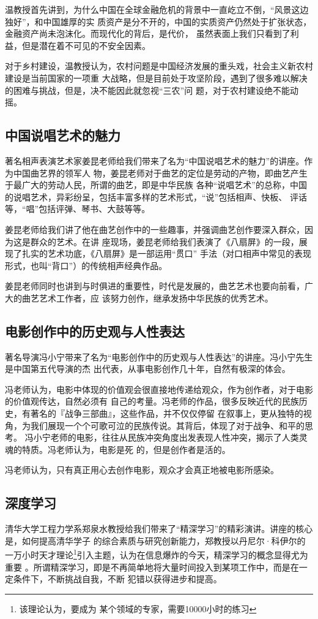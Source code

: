 \documentclass[a4paper]{cctart}
\numberwithin{equation}{section} \pagestyle{fancy}
\begin{document}
温教授首先讲到，为什么中国在全球金融危机的背景中一直屹立不倒，“风景这边独好”，和中国雄厚的实
质资产是分不开的，中国的实质资产仍然处于扩张状态，金融资产尚未泡沫化。而现代化的背后，是代价，
虽然表面上我们只看到了利益，但是潜在着不可见的不安全因素。

对于乡村建设，温教授认为，农村问题是中国经济发展的重头戏，社会主义新农村建设是当前国家的一项重
大战略，但是目前处于攻坚阶段，遇到了很多难以解决的困难与挑战，但是，决不能因此就忽视“三农”问
题，对于农村建设绝不能动摇。
\subsection{中国说唱艺术的魅力}
著名相声表演艺术家姜昆老师给我们带来了名为“中国说唱艺术的魅力”的讲座。作为中国曲艺界的领军人
物，姜昆老师对于曲艺的定位是劳动的产物，即曲艺产生于最广大的劳动人民，所谓的曲艺，即是中华民族
各种“说唱艺术”的总称，中国的说唱艺术，异彩纷呈，包括丰富多样的艺术形式，“说”包括相声、快板、
评话等，“唱”包括评弹、琴书、大鼓等等。

姜昆老师给我们讲了他在曲艺创作中的一些趣事，并强调曲艺创作要深入群众，因为这是群众的艺术。在讲
座现场，姜昆老师给我们表演了《八扇屏》的一段，展现了扎实的艺术功底，《八扇屏》是一部运用“贯口”
手法（对口相声中常见的表现形式，也叫“背口”）的传统相声经典作品。

姜昆老师同时也讲到与时俱进的重要性，时代是发展的，曲艺艺术也要向前看，广大的曲艺艺术工作者，应
该努力创作，继承发扬中华民族的优秀艺术。
\subsection{电影创作中的历史观与人性表达}
著名导演冯小宁带来了名为“电影创作中的历史观与人性表达”的讲座。冯小宁先生是中国第五代导演的杰
出代表，从事电影创作几十年，自然有极深的体会。

冯老师认为，电影中体现的价值观会很直接地传递给观众，作为创作者，对于电影的价值观传达，自然必须有
自己的考量。冯老师的作品，很多反映近代的民族历史，有著名的『战争三部曲』，这些作品，并不仅仅停留
在叙事上，更从独特的视角，为我们展现一个个可歌可泣的民族传说。其背后，体现了对于战争、和平的思考。
冯小宁老师的电影，往往从民族冲突角度出发表现人性冲突，揭示了人类灵魂的特质。冯老师认为，电影是死
的，但是创作者是活的。

冯老师认为，只有真正用心去创作电影，观众才会真正地被电影所感染。
\subsection{深度学习}
清华大学工程力学系郑泉水教授给我们带来了“精深学习”的精彩演讲。讲座的核心是，如何提高清华学子
的综合素质与研究创新能力，郑教授以丹尼尔·科伊尔的一万小时天才理论\footnote{该理论认为，要成为
某个领域的专家，需要10000小时的练习}引入主题，认为在信息爆炸的今天，精深学习的概念显得尤为重要
。所谓精深学习，即是不再简单地将大量时间投入到某项工作中，而是在一定条件下，不断挑战自我，不断
犯错以获得进步和提高。
\end{document}
